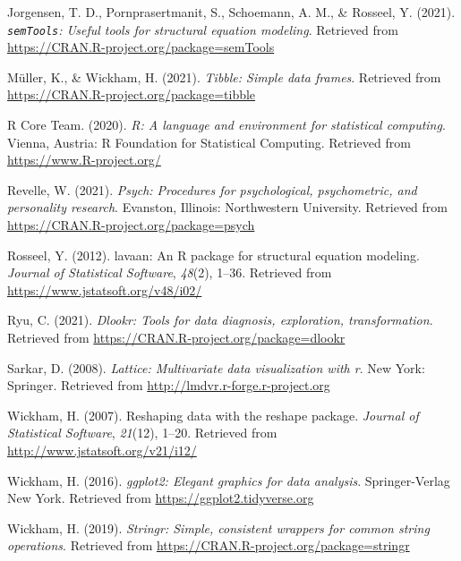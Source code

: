 \documentclass[
  english,
  man]{apa6}
\newlength{\cslhangindent}
\newenvironment{CSLReferences}[2] %
 {%
  \setlength{\parindent}{0pt}
  \ifodd #1 \everypar{\setlength{\hangindent}{\cslhangindent}}\ignorespaces\fi
  \ifnum #2 > 0
  \setlength{\parskip}{#2\baselineskip}
  \fi
 }%
 {}
\begin{document}
\begin{CSLReferences}{1}{0}
\leavevmode{}%
Jorgensen, T. D., Pornprasertmanit, S., Schoemann, A. M., \& Rosseel, Y. (2021). \emph{\texttt{semTools}: {U}seful tools for structural equation modeling}. Retrieved from \url{https://CRAN.R-project.org/package=semTools}

\leavevmode{}%
Müller, K., \& Wickham, H. (2021). \emph{Tibble: Simple data frames}. Retrieved from \url{https://CRAN.R-project.org/package=tibble}

\leavevmode{}%
R Core Team. (2020). \emph{R: A language and environment for statistical computing}. Vienna, Austria: R Foundation for Statistical Computing. Retrieved from \url{https://www.R-project.org/}

\leavevmode{}%
Revelle, W. (2021). \emph{Psych: Procedures for psychological, psychometric, and personality research}. Evanston, Illinois: Northwestern University. Retrieved from \url{https://CRAN.R-project.org/package=psych}

\leavevmode{}%
Rosseel, Y. (2012). {lavaan}: An {R} package for structural equation modeling. \emph{Journal of Statistical Software}, \emph{48}(2), 1--36. Retrieved from \url{https://www.jstatsoft.org/v48/i02/}

\leavevmode{}%
Ryu, C. (2021). \emph{Dlookr: Tools for data diagnosis, exploration, transformation}. Retrieved from \url{https://CRAN.R-project.org/package=dlookr}

\leavevmode{}%
Sarkar, D. (2008). \emph{Lattice: Multivariate data visualization with r}. New York: Springer. Retrieved from \url{http://lmdvr.r-forge.r-project.org}

\leavevmode{}%
Wickham, H. (2007). Reshaping data with the {reshape} package. \emph{Journal of Statistical Software}, \emph{21}(12), 1--20. Retrieved from \url{http://www.jstatsoft.org/v21/i12/}

\leavevmode{}%
Wickham, H. (2016). \emph{ggplot2: Elegant graphics for data analysis}. Springer-Verlag New York. Retrieved from \url{https://ggplot2.tidyverse.org}

\leavevmode{}%
Wickham, H. (2019). \emph{Stringr: Simple, consistent wrappers for common string operations}. Retrieved from \url{https://CRAN.R-project.org/package=stringr}


\end{CSLReferences}
\end{document}
